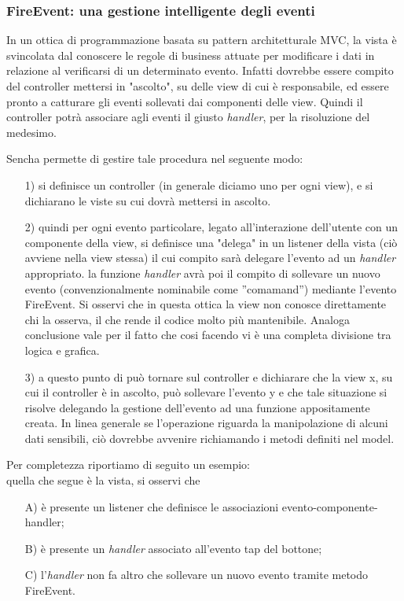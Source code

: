 \documentclass[10pt,a4paper,onecolumn]{article}
\begin{document}
\subsubsection{FireEvent: una gestione intelligente degli eventi}
In un ottica di programmazione basata su pattern architetturale MVC, la vista è svincolata dal conoscere le regole di business attuate per modificare i dati in relazione al verificarsi di un determinato evento. Infatti dovrebbe essere compito del controller mettersi in "ascolto", su delle view di cui è responsabile, ed essere pronto a catturare gli eventi sollevati dai componenti delle view. Quindi il controller potrà associare agli eventi il giusto \textit{handler}, per la risoluzione del medesimo.

Sencha permette di gestire tale procedura nel seguente modo:
\begin{itemize}
	\item[1)] si definisce un controller (in generale diciamo uno per ogni view), e si dichiarano le viste su cui dovrà mettersi in ascolto.
	\item[2)] quindi per ogni evento particolare, legato all'interazione dell'utente con un componente della view, si definisce una "delega" in un listener della vista (ciò avviene nella view stessa) il cui compito sarà delegare l'evento ad un \textit{handler} appropriato. la funzione \textit{handler} avrà poi il compito di sollevare un nuovo evento (convenzionalmente nominabile come ''comamand'') mediante l'evento FireEvent. Si osservi che in questa ottica la view non conosce direttamente chi la osserva, il che rende il codice molto più mantenibile. Analoga conclusione vale per il fatto che cosi facendo vi è una completa divisione tra logica e grafica.
	\item[3)] a questo punto di può tornare sul controller e dichiarare che la view x, su cui il controller è in ascolto, può sollevare l'evento y e che tale situazione si risolve delegando la gestione dell'evento ad una funzione appositamente creata. In linea generale se l'operazione riguarda la manipolazione di alcuni dati sensibili, ciò dovrebbe avvenire richiamando i metodi definiti nel model.
\end{itemize}

Per completezza riportiamo di seguito un esempio:\\

quella che segue è la vista, si osservi che 
\begin{itemize}
	\item[A)] è presente un listener che definisce le associazioni evento-componente-handler; 
	\item[B)] è presente un \textit{handler} associato all'evento tap del bottone;
	\item[C)] l'\textit{handler} non fa altro che sollevare un nuovo evento tramite metodo FireEvent.
\end{itemize}
\end{document}
